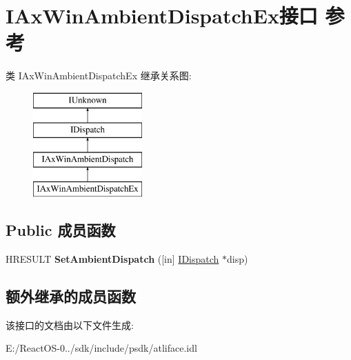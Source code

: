 \hypertarget{interface_i_ax_win_ambient_dispatch_ex}{}\section{I\+Ax\+Win\+Ambient\+Dispatch\+Ex接口 参考}
\label{interface_i_ax_win_ambient_dispatch_ex}
类 I\+Ax\+Win\+Ambient\+Dispatch\+Ex 继承关系图\+:\begin{figure}[H]
\begin{center}
\leavevmode
\includegraphics[height=4.000000cm]{interface_i_ax_win_ambient_dispatch_ex}
\end{center}
\end{figure}
\subsection*{Public 成员函数}
\begin{DoxyCompactItemize}
\item 
\mbox{\label{interface_i_ax_win_ambient_dispatch_ex_a7f44446d3dd18e6e041c7e159f6a391e}} 
H\+R\+E\+S\+U\+LT {\bfseries Set\+Ambient\+Dispatch} (\mbox{[}in\mbox{]} \hyperlink{interface_i_dispatch}{I\+Dispatch} $\ast$disp)
\end{DoxyCompactItemize}
\subsection*{额外继承的成员函数}


该接口的文档由以下文件生成\+:\begin{DoxyCompactItemize}
\item 
E\+:/\+React\+O\+S-\/0../sdk/include/psdk/atliface.\+idl\end{DoxyCompactItemize}
